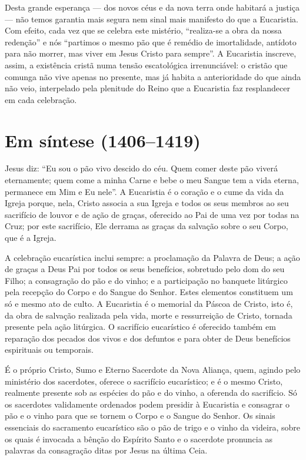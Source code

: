 Desta grande esperança --- dos novos céus e da nova terra onde habitará a justiça --- não temos garantia mais segura nem sinal mais manifesto do que a Eucaristia. Com efeito, cada vez que se celebra este mistério, ``realiza-se a obra da nossa redenção'' e nós ``partimos o mesmo pão que é remédio de imortalidade, antídoto para não morrer, mas viver em Jesus Cristo para sempre''. A Eucaristia inscreve, assim, a existência cristã numa tensão escatológica irrenunciável: o cristão que comunga não vive apenas no presente, mas já habita a anterioridade do que ainda não veio, interpelado pela plenitude do Reino que a Eucaristia faz resplandecer em cada celebração.

\section{Em síntese (1406--1419)}

Jesus diz: ``Eu sou o pão vivo descido do céu. Quem comer deste pão viverá eternamente; quem come a minha Carne e bebe o meu Sangue tem a vida eterna, permanece em Mim e Eu nele''. A Eucaristia é o coração e o cume da vida da Igreja porque, nela, Cristo associa a sua Igreja e todos os seus membros ao seu sacrifício de louvor e de ação de graças, oferecido ao Pai de uma vez por todas na Cruz; por este sacrifício, Ele derrama as graças da salvação sobre o seu Corpo, que é a Igreja.

A celebração eucarística inclui sempre: a proclamação da Palavra de Deus; a ação de graças a Deus Pai por todos os seus benefícios, sobretudo pelo dom do seu Filho; a consagração do pão e do vinho; e a participação no banquete litúrgico pela recepção do Corpo e do Sangue do Senhor. Estes elementos constituem um só e mesmo ato de culto. A Eucaristia é o memorial da Páscoa de Cristo, isto é, da obra de salvação realizada pela vida, morte e ressurreição de Cristo, tornada presente pela ação litúrgica. O sacrifício eucarístico é oferecido também em reparação dos pecados dos vivos e dos defuntos e para obter de Deus benefícios espirituais ou temporais.

É o próprio Cristo, Sumo e Eterno Sacerdote da Nova Aliança, quem, agindo pelo ministério dos sacerdotes, oferece o sacrifício eucarístico; e é o mesmo Cristo, realmente presente sob as espécies do pão e do vinho, a oferenda do sacrifício. Só os sacerdotes validamente ordenados podem presidir à Eucaristia e consagrar o pão e o vinho para que se tornem o Corpo e o Sangue do Senhor. Os sinais essenciais do sacramento eucarístico são o pão de trigo e o vinho da videira, sobre os quais é invocada a bênção do Espírito Santo e o sacerdote pronuncia as palavras da consagração ditas por Jesus na última Ceia.

